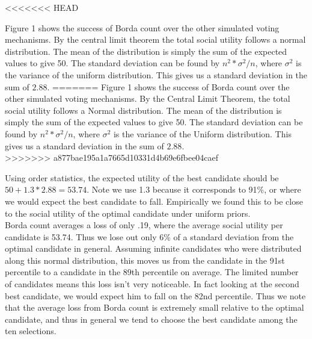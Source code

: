 \documentclass[11pt]{scrartcl}
\begin{document}
<<<<<<< HEAD

Figure 1 shows the success of Borda count over the other simulated voting mechanisms. By the central limit theorem the total social utility follows a normal distribution. The mean of the distribution is simply the sum of the expected values to give 50. The standard deviation can be found by $n^2 * \sigma^2/n$, where $\sigma^2$ is the variance of the uniform distribution. This gives us a standard deviation in the sum of $2.88$.
=======
Figure 1 shows the success of Borda count over the other simulated voting mechanisms. By the Central Limit Theorem, the total social utility follows a Normal distribution. The mean of the distribution is simply the sum of the expected values to give 50. The standard deviation can be found by $n^2 * \sigma^2/n$, where $\sigma^2$ is the variance of the Uniform distribution. This gives us a standard deviation in the sum of $2.88$.\\
>>>>>>> a877bae195a1a7665d10331d4b69e6fbee04caef

Using order statistics, the expected utility of the best candidate should be $50 + 1.3*2.88 = 53.74$. Note we use 1.3 because it corresponds to 91\%, or where we would expect the best candidate to fall. Empirically we found this to be close to the social utility of the optimal candidate under uniform priors.\\

Borda count averages a loss of only .19, where the average social utility per candidate is 53.74. Thus we lose out only 6\% of a standard deviation from the optimal candidate in general. Assuming infinite candidates who were distributed along this normal distribution, this moves us from the candidate in the 91st percentile to a candidate in the 89th percentile on average. The limited number of candidates means this loss isn't very noticeable. In fact looking at the second best candidate, we would expect him to fall on the 82nd percentile. Thus we note that the average loss from Borda count is extremely small relative to the optimal candidate, and thus in general we tend to choose the best candidate among the ten selections.\\
\end{document}
